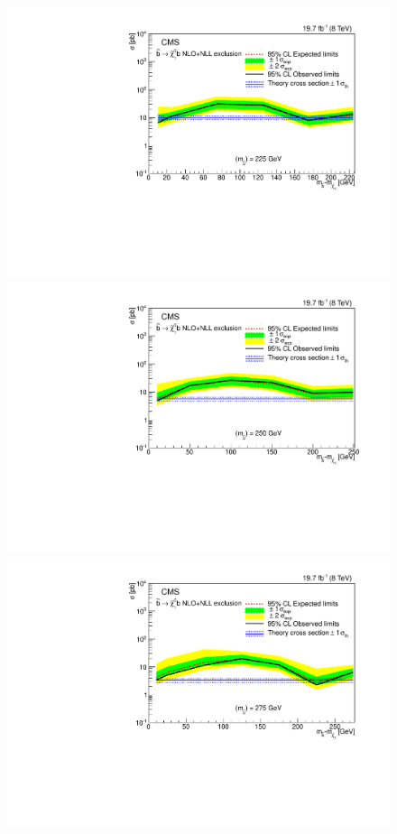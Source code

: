 \begin{figure}[!Hhtb]
\begin{center}
  \includegraphics[scale=0.39]{Figures/sus13009/sbottomlimits/Limit_225.pdf}
  \includegraphics[scale=0.39]{Figures/sus13009/sbottomlimits/Limit_250.pdf}
  \includegraphics[scale=0.39]{Figures/sus13009/sbottomlimits/Limit_275.pdf}

\end{center}
\end{figure}
